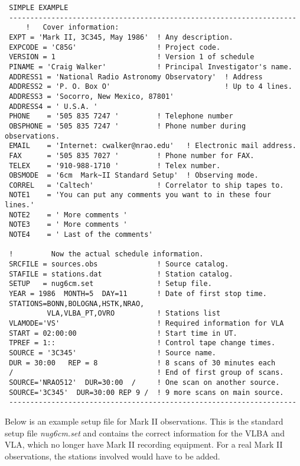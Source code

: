 \documentclass{report}
\begin{document}
\begin{verbatim}
 SIMPLE EXAMPLE
 --------------------------------------------------------------------
     !   Cover information:
 EXPT = 'Mark II, 3C345, May 1986'  ! Any description.
 EXPCODE = 'C85G'                   ! Project code.
 VERSION = 1                        ! Version 1 of schedule
 PINAME = 'Craig Walker'            ! Principal Investigator's name.
 ADDRESS1 = 'National Radio Astronomy Observatory'  ! Address
 ADDRESS2 = 'P. O. Box O'                           ! Up to 4 lines.
 ADDRESS3 = 'Socorro, New Mexico, 87801'
 ADDRESS4 = ' U.S.A. '
 PHONE    = '505 835 7247 '         ! Telephone number
 OBSPHONE = '505 835 7247 '         ! Phone number during observations.
 EMAIL    = 'Internet: cwalker@nrao.edu'   ! Electronic mail address.
 FAX      = '505 835 7027 '         ! Phone number for FAX.
 TELEX    = '910-988-1710 '         ! Telex number.
 OBSMODE  = '6cm  Mark~II Standard Setup'  ! Observing mode.
 CORREL   = 'Caltech'               ! Correlator to ship tapes to.
 NOTE1    = 'You can put any comments you want to in these four lines.'
 NOTE2    = ' More comments '
 NOTE3    = ' More comments '
 NOTE4    = ' Last of the comments'

 !         Now the actual schedule information.
 SRCFILE = sources.obs              ! Source catalog.
 STAFILE = stations.dat             ! Station catalog.
 SETUP   = nug6cm.set               ! Setup file.
 YEAR = 1986  MONTH=5  DAY=11       ! Date of first stop time.
 STATIONS=BONN,BOLOGNA,HSTK,NRAO,
          VLA,VLBA_PT,OVRO          ! Stations list
 VLAMODE='VS'                       ! Required information for VLA
 START = 02:00:00                   ! Start time in UT.
 TPREF = 1::                        ! Control tape change times.
 SOURCE = '3C345'                   ! Source name.
 DUR = 30:00   REP = 8              ! 8 scans of 30 minutes each
 /                                  ! End of first group of scans.
 SOURCE='NRAO512'  DUR=30:00  /     ! One scan on another source.
 SOURCE='3C345'  DUR=30:00 REP 9 /  ! 9 more scans on main source.
 --------------------------------------------------------------------

\end{verbatim}

\newpage

Below is an example setup file for Mark II observations.
This is the standard setup file {\sl nug6cm.set} and contains
the correct information for the VLBA and VLA, which no longer have
Mark II recording equipment.  For a real Mark II observations, the
stations involved would have to be added.
\end{document}
